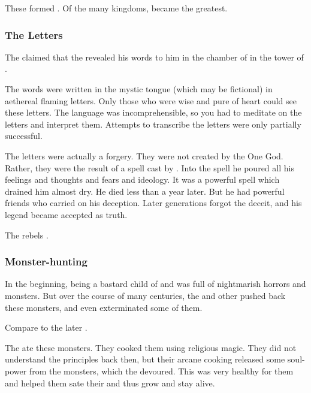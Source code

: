 These formed \Merkyrah. 
Of the many \resphan{} kingdoms, \Merkyrah became the greatest. 





\subsubsection{The \Hoshiabalon Letters}
\index{\Hoshiabalon}
The \resphan {} claimed that the  revealed his words to him in the chamber of  in the tower of . 

The words were written in the mystic \quo{\Umaric} tongue (which may be fictional) in aethereal flaming letters. 
Only those who were wise and pure of heart could see these letters. 
The language was incomprehensible, so you had to meditate on the letters and interpret them. 
Attempts to transcribe the letters were only partially successful.

The letters were actually a forgery. 
They were not created by the One God.
Rather, they were the result of a spell cast by \Berugiel. 
Into the spell he poured all his feelings and thoughts and fears and ideology. 
It was a powerful spell which drained him almost dry.
He died less than a year later.
But he had powerful friends who carried on his deception. 
Later generations forgot the deceit, and his legend became accepted as truth. 

The rebels . 





\subsubsection{Monster-hunting}
In the beginning, \Nyx{}\dash being a bastard child of \Erebos{} and \Miith\dash was full of nightmarish horrors and monsters. 
But over the course of many centuries, the \Merkyrans{} and other \resphain{} pushed back these monsters, and even exterminated some of them. 

Compare to the later \human{} . 

The \resphain{} ate these monsters.
They cooked them using religious magic. 
They did not understand the principles back then, but their arcane cooking released some soul-power from the monsters, which the \resphain{} devoured. 
This was very healthy for them and helped them sate their  and thus grow and stay alive. 

